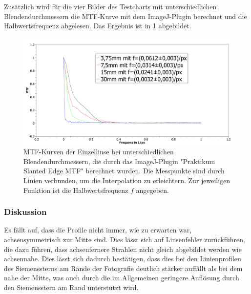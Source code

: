 \documentclass[
	a4paper,
	12pt,
	pagesize,
	ngerman
]{scrartcl}
\begin{document}
	Zusätzlich wird für die vier Bilder des Testcharts mit unterschiedlichen Blendendurchmessern die MTF-Kurve  mit dem ImageJ-Plugin berechnet und die Halbwertsfrequenz abgelesen.
	Das Ergebnis ist in \cref{fig_einzel_mtf} abgebildet.
	
	\begin{figure}[H]  
		\includegraphics[width=1\textwidth]{fig_Einzellinse_MTF}
		\centering
		\caption{
			MTF-Kurven der Einzellinse bei unterschiedlichen Blendendurchmessern, die durch das ImageJ-Plugin "Praktikum Slanted Edge MTF" berechnet wurden.
			Die Messpunkte sind durch Linien verbunden, um die Interpolation zu erleichtern. %
			Zur jeweiligen Funktion ist die Halbwertsfrequenz $f$ angegeben.
		}
		\label{fig_einzel_mtf}
		\centering
	\end{figure}
	

	\subsubsection{Diskussion}
	
	Es fällt auf, dass die Profile nicht immer, wie zu erwarten war, achsensymmetrisch zur Mitte sind.
	Dies lässt sich auf Linsenfehler zurückführen, die dazu führen, dass achsenfernere Strahlen nicht gleich abgebildet werden wie achsennahe.
	Dies lässt sich dadurch bestätigen, dass dies bei den Linienprofilen des Siemenssterns am Rande der Fotografie deutlich stärker auffällt als bei dem nahe der Mitte, was auch durch die im Allgemeinen geringere Auflösung durch den Siemensstern am Rand unterstützt wird.
	
\end{document}
